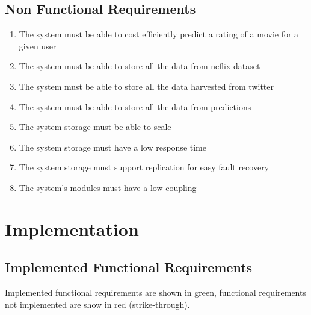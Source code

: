 \section{Non Functional Requirements}
\begin{enumerate}[label=\bfseries NFR \arabic*:]
  \item The system must be able to cost efficiently predict a rating of a movie for a given user
  \item The system must be able to store all the data from neflix dataset
  \item The system must be able to store all the data harvested from twitter
  \item The system must be able to store all the data from predictions
  \item The system storage must be able to scale
  \item The system storage must have a low response time
  \item The system storage must support replication for easy fault recovery
  \item The system's modules must have a low coupling
\end{enumerate}






\chapter{Implementation}\label{app:impl}
\section{Implemented Functional Requirements}
Implemented functional requirements are shown in green, functional requirements not implemented are show in red (strike-through).

